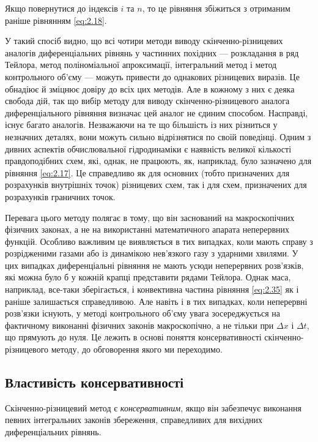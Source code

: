 Якщо повернутися до індексів $i$ та $n$, то це рівняння збіжиться з отриманим раніше рівнянням \eqref{eq:2.18}. \medskip

У такий спосіб видно, що всі чотири методи виводу скінченно-різницевих аналогів диференціальних рівнянь у частинних похідних --- розкладання в ряд Тейлора, метод поліноміальної апроксимації, інтегральний метод і метод контрольного об'єму --- можуть привести до однакових різницевих виразів. Це обнадіює й зміцнює довіру до всіх цих методів. Але в кожному з них є деяка свобода дій, так що вибір методу для виводу скінченно-різницевого аналога диференціального рівняння визначає цей аналог не єдиним способом. Насправді, існує багато аналогів. Незважаючи на те що більшість із них різниться у незначних деталях, вони можуть сильно відрізнятися по своїй поведінці. Одним з дивних аспектів обчислювальної гідродинаміки є наявність великої кількості правдоподібних схем, які, однак, не працюють, як, наприклад, було зазначено для рівняння \eqref{eq:2.17}. Це справедливо як для основних (тобто призначених для розрахунків внутрішніх точок) різницевих схем, так і для схем, призначених для розрахунків граничних точок. \medskip

Перевага цього методу полягає в тому, що він заснований на макроскопічних фізичних законах, а не на використанні математичного апарата неперервних функцій. Особливо важливим це виявляється в тих випадках, коли мають справу з розрідженими газами або із динамікою нев'язкого газу з ударними хвилями. У цих випадках диференціальні рівняння не мають усюди неперервних розв'язків, які можна було б у кожній крапці представити рядами Тейлора. Однак маса, наприклад, все-таки зберігається, і конвективна частина рівняння \eqref{eq:2.35} як і раніше залишається справедливою. Але навіть і в тих випадках, коли неперервні розв'язки існують, у методі контрольного об'єму увага зосереджується на фактичному виконанні фізичних законів макроскопічно, а не тільки при $\Delta x$ і $\Delta t$, що прямують до нуля. Це лежить в основі поняття консервативності скінченно-різницевого методу, до обговорення якого ми переходимо.

\subsection{Властивість консервативності} %

\begin{definition}
    Скінченно-різницевий метод є \textit{консервативним}, якщо він забезпечує виконання певних інтегральних законів збереження, справедливих для вихідних диференціальних рівнянь.
\end{definition}

